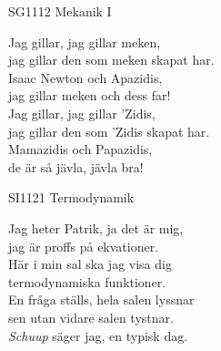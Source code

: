 \documentclass[a6paper, 10pt, twoside]{article}
\begin{document}
\noindent
\begin{center}
\footnotesize SG1112 Mekanik I\\
\end{center}
\begin{lyrics}
Jag gillar, jag gillar meken, \\
jag gillar den som meken skapat har. \\
Isaac Newton och Apazidis, \\
jag gillar meken och dess far!
\vspace{5pt} \\
Jag gillar, jag gillar 'Zidis, \\
jag gillar den som 'Zidis skapat har. \\
Mamazidis och Papazidis, \\
de är så jävla, jävla bra!
\end{lyrics}

\vspace{20pt}
\begin{center}
\footnotesize SI1121 Termodynamik\\
\end{center}
\begin{lyrics}
Jag heter Patrik, ja det är mig, \\
jag är proffs på ekvationer. \\
Här i min sal ska jag visa dig \\
termodynamiska funktioner. \\
En fråga ställs, hela salen lyssnar \\
sen utan vidare salen tystnar. \\
\textit{Schuup} säger jag, en typisk dag. 
\end{lyrics}
\end{document}
